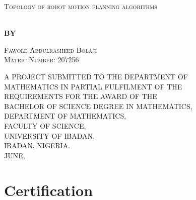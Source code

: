 \documentclass[
    a4paper,%
    12pt,%
    oneside, %
    openany, %
]{book}
\begin{document}
\baselineskip24pt

\thispagestyle{empty}
\thispagestyle{empty}

\begin{center}
    \begin{LARGE}
        \textsc{Topology of robot motion planning algorithms}
    \end{LARGE}
    \\[2cm]
    \textbf{BY}\\[1.0cm]
    \begin{large}
        \textsc{Fawole Abdulrasheed Bolaji}\\
        \textsc{Matric Number: 207256}\\[3cm]
    \end{large}

    \textsc{A PROJECT SUBMITTED TO THE DEPARTMENT OF\\ MATHEMATICS IN PARTIAL FULFILMENT OF THE\\ REQUIREMENTS FOR THE AWARD OF THE\\ BACHELOR OF SCIENCE DEGREE IN MATHEMATICS,\\ DEPARTMENT OF MATHEMATICS,\\FACULTY OF SCIENCE,\\
        UNIVERSITY OF IBADAN,\\IBADAN, NIGERIA.\\
        \vspace*{4.5cm}
        JUNE,}
\end{center}

\newpage


\chapter*{Certification}
\end{document}
